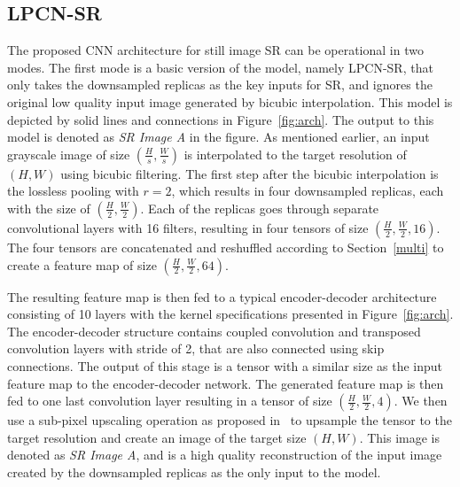 \documentclass[10pt,twocolumn,letterpaper]{article}
\begin{document}
\subsection{LPCN-SR}
\label{only}
The proposed CNN architecture for still image SR can be operational in two modes. The first mode is a basic version of the model,
namely LPCN-SR, that only takes the downsampled replicas as the key inputs for SR, and ignores the original low quality input image generated by bicubic 
interpolation. This model is depicted by solid lines and connections in Figure~\ref{fig:arch}. The output to this model is denoted as
\emph{SR Image A} in the figure. As mentioned earlier, an input grayscale image of size $(\frac{H}{s}, \frac{W}{s})$ is interpolated to 
the target resolution of $(H, W)$ using bicubic filtering. The first step after the bicubic interpolation is the lossless pooling 
with $r=2$, which results in four downsampled replicas, each with the size of $(\frac{H}{2}, \frac{W}{2})$. Each of the replicas goes through
separate convolutional layers with 16 filters, resulting in four tensors of size $(\frac{H}{2}, \frac{W}{2}, 16)$. The four tensors are concatenated 
and reshuffled according to Section~\ref{multi} to create a feature map of size $(\frac{H}{2}, \frac{W}{2}, 64)$.  

The resulting feature map is then fed to a typical encoder-decoder architecture consisting of 10 layers with the kernel specifications presented
in Figure~\ref{fig:arch}. The encoder-decoder structure contains coupled convolution and transposed convolution layers with stride of 2, 
that are also connected using skip connections. The output of this stage is a tensor with a similar size as the input feature map to 
the encoder-decoder network. The generated feature map is then fed to one last convolution layer resulting in a tensor of size
$(\frac{H}{2}, \frac{W}{2}, 4)$. We then use a sub-pixel upscaling operation as proposed in~\cite{shi2016} to upsample the tensor to 
the target resolution and create an image of the target size $(H, W)$. This image is denoted as \emph{SR Image A}, and is a high quality
reconstruction of the input image created by the downsampled replicas as the only input to the model.
\end{document}
